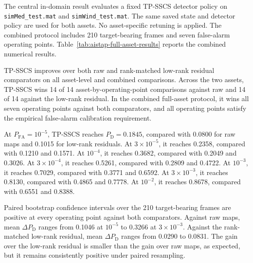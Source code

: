 \documentclass[journal]{IEEEtran}
\begin{document}
The central in-domain result evaluates a fixed TP-SSCS detector policy on \texttt{simMed\_test.mat} and \texttt{simWind\_test.mat}. The same saved state and detector policy are used for both assets. No asset-specific retuning is applied. The combined protocol includes 210 target-bearing frames and seven false-alarm operating points. Table~\ref{tab:aistap-full-asset-results} reports the combined numerical results.

TP-SSCS improves over both raw and rank-matched low-rank residual comparators on all asset-level and combined comparisons. Across the two assets, TP-SSCS wins 14 of 14 asset-by-operating-point comparisons against raw and 14 of 14 against the low-rank residual. In the combined full-asset protocol, it wins all seven operating points against both comparators, and all operating points satisfy the empirical false-alarm calibration requirement.

At $P_{\mathrm{FA}}=10^{-5}$, TP-SSCS reaches $P_{\mathrm{D}}=0.1845$, compared with 0.0800 for raw maps and 0.1015 for low-rank residuals. At $3 \times 10^{-5}$, it reaches 0.2358, compared with 0.1210 and 0.1571. At $10^{-4}$, it reaches 0.3682, compared with 0.2049 and 0.3026. At $3 \times 10^{-4}$, it reaches 0.5261, compared with 0.2809 and 0.4722. At $10^{-3}$, it reaches 0.7029, compared with 0.3771 and 0.6592. At $3 \times 10^{-3}$, it reaches 0.8130, compared with 0.4865 and 0.7778. At $10^{-2}$, it reaches 0.8678, compared with 0.6551 and 0.8388.

Paired bootstrap confidence intervals over the 210 target-bearing frames are positive at every operating point against both comparators. Against raw maps, mean $\Delta P_{\mathrm{D}}$ ranges from 0.1046 at $10^{-5}$ to 0.3266 at $3 \times 10^{-3}$. Against the rank-matched low-rank residual, mean $\Delta P_{\mathrm{D}}$ ranges from 0.0290 to 0.0831. The gain over the low-rank residual is smaller than the gain over raw maps, as expected, but it remains consistently positive under paired resampling.
\end{document}
